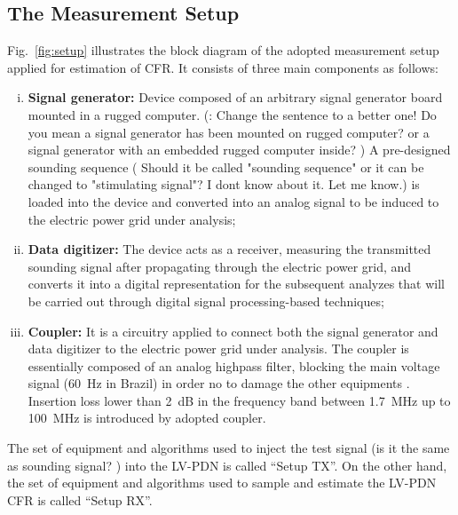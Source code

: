 \documentclass[journal]{IEEEtran}
\begin{document}
	\subsection{The Measurement Setup}
	\color{blue} Fig.~\ref{fig:setup} illustrates the block diagram of the adopted measurement setup applied for estimation of \ac{CFR}. It consists of three main components as follows: \color{black}
	\begin{enumerate}[(i)]
		\item \color{blue} {\bf Signal generator:} \color{black} Device composed of an arbitrary signal generator board mounted in a rugged computer. \color{red}(: Change the sentence to a better one! Do you mean a signal generator has been mounted on rugged computer? or a signal generator with an embedded rugged computer inside? ) \color{black}
		A pre-designed sounding sequence \color{red}( Should it be called "sounding sequence" or it can be changed to "stimulating signal"? I dont know about it. Let me know.)\color{black} is loaded into \color{blue} the device \color{black} and converted \color{blue} into \color{black} an analog signal to be \color{black} induced\color{black} to the electric power grid under analysis;
		\item \color{blue} {\bf Data digitizer:}\color{black}  The device acts as a receiver, measuring the transmitted sounding signal after propagating through the electric power grid,
		and converts it into a digital representation for the subsequent analyzes that will be carried out through digital signal processing-based techniques;
		\item \color{blue} {\bf Coupler:} It is a \color{black} circuitry applied to connect both the signal generator and data digitizer to the electric power grid under analysis.
		The coupler is essentially composed of an analog highpass filter, blocking the main voltage signal ($60$~Hz in Brazil) \color{blue} in order no to \color{black} damage the other equipments \cite{SilvaCosta2017}. 
		Insertion loss lower than 2~dB in the frequency band between 1.7~MHz up to 100~MHz is introduced by adopted coupler.
	\end{enumerate}
	
	The set of equipment and algorithms used to inject the test signal \color{red}(is it the same as sounding signal? )\color{black} into the \ac{LV-PDN} is called \color{blue} ``Setup TX''\color{black}. 
	On the other hand, the set of equipment and algorithms used to sample and estimate the \ac{LV-PDN} \ac{CFR} is called \color{blue} ``Setup RX''\color{black}.
	
\end{document}
